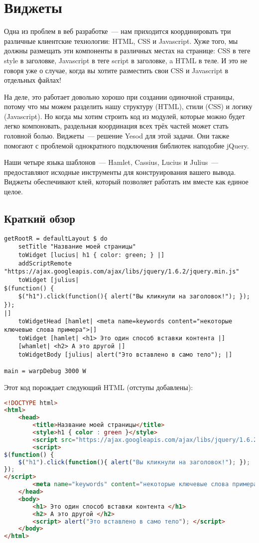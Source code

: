 \chapter{Виджеты}

Одна из проблем в веб разработке~--- нам приходится координировать три различные клиентские технологии: HTML, CSS и Javascript. Хуже того, мы должны размещать эти компоненты в различных местах на странице: CSS в теге style в заголовке, Javascript в теге script в заголовке, a HTML в теле. И это не говоря уже о случае, когда вы хотите разместить свои CSS и Javascript в отдельных файлах!

На деле, это работает довольно хорошо при создании одиночной страницы, потому что мы можем разделить нашу структуру (HTML), стили (CSS) и логику (Javascript). Но когда мы хотим строить код из модулей, которые можно будет легко компоновать, раздельная координация всех трёх частей может стать головной болью. Виджеты~--- решение Yesod для этой задачи. Они также помогают с проблемой однократного подключения библиотек наподобие jQuery.

Наши четыре языка шаблонов~--- Hamlet, Cassius, Lucius и Julius~--- предоставляют исходные инструменты для конструирования вашего вывода. Виджеты обеспечивают клей, который позволяет работать им вместе как единое целое.

\section{Краткий обзор}

\begin{lstlisting}
getRootR = defaultLayout $ do
    setTitle "Название моей страницы"
    toWidget [lucius| h1 { color: green; } |]
    addScriptRemote "https://ajax.googleapis.com/ajax/libs/jquery/1.6.2/jquery.min.js"
    toWidget [julius|
$(function() {
    $("h1").click(function(){ alert("Вы кликнули на заголовок!"); });
});
|]
    toWidgetHead [hamlet| <meta name=keywords content="некоторые ключевые слова примера">|]
    toWidget [hamlet| <h1> Это один способ вставки контента |]
    [whamlet| <h2> А это другой |]
    toWidgetBody [julius| alert("Это вставлено в само тело"); |]

main = warpDebug 3000 W
\end{lstlisting}

Этот код порождает следующий HTML (отступы добавлены):

\begin{lstlisting}[language=HTML]
<!DOCTYPE html>
<html>
    <head>
        <title>Название моей страницы</title>
        <style>h1 { color : green }</style>
        <script src="https://ajax.googleapis.com/ajax/libs/jquery/1.6.2/jquery.min.js"></script>
        <script>
$(function() {
    $("h1").click(function(){ alert("Вы кликнули на заголовок!"); });
});
</script>
        <meta name="keywords" content="некоторые ключевые слова примера">
    </head>
    <body>
        <h1> Это один способ вставки контента </h1>
        <h2> А это другой </h2>
        <script> alert("Это вставлено в само тело"); </script>
    </body>
</html>
\end{lstlisting}

